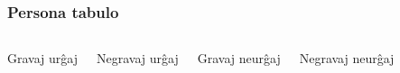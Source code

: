  \begin{frame}
    \frametitle{Persona tabulo}
    
    	\begin{columns}
	    \begin{block}
	    
	    	Gravaj urĝaj
	    
    	\end{block}
    	\begin{block}
    	
    		Negravaj urĝaj
    	
    	\end{block}
    	\begin{block}
    	
    		Gravaj neurĝaj
    		
    	\end{block}
    	\begin{block}
    	
    		Negravaj neurĝaj
    		
    	\end{block}
    	
	\end{columns}
  \end{frame}

